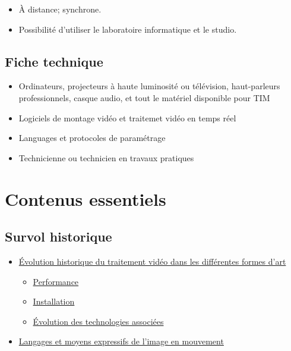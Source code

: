 \documentclass[
]{book}
\providecommand{\tightlist}{%
  \setlength{\itemsep}{0pt}\setlength{\parskip}{0pt}}
\begin{document}
\begin{itemize}
\tightlist
\item
  À distance; synchrone.
\item
  Possibilité d'utiliser le laboratoire informatique et le studio.
\end{itemize}

\hypertarget{fiche-technique}{%
\subsection{Fiche technique}\label{fiche-technique}}

\begin{itemize}
\tightlist
\item
  Ordinateurs, projecteurs à haute luminosité ou télévision, haut-parleurs professionnels, casque audio, et tout le matériel disponible pour TIM
\item
  Logiciels de montage vidéo et traitemet vidéo en temps réel
\item
  Languages et protocoles de paramétrage\\
\item
  Technicienne ou technicien en travaux pratiques
\end{itemize}

\hypertarget{contenus_essentiels}{%
\section{Contenus essentiels}\label{contenus_essentiels}}

\hypertarget{survol-historique}{%
\subsection{Survol historique}\label{survol-historique}}

\begin{itemize}
\tightlist
\item
  \protect\hyperlink{evolution_historique}{Évolution historique du traitement vidéo dans les différentes formes d'art}

  \begin{itemize}
  \tightlist
  \item
    \protect\hyperlink{evolution_historique_performance}{Performance}
  \item
    \protect\hyperlink{evolution_historique_installation}{Installation}
  \item
    \protect\hyperlink{evolution_historique_technologies}{Évolution des technologies associées}
  \end{itemize}
\item
  \protect\hyperlink{evolution_historique_language}{Langages et moyens expressifs de l'image en mouvement}
\end{itemize}
\end{document}
